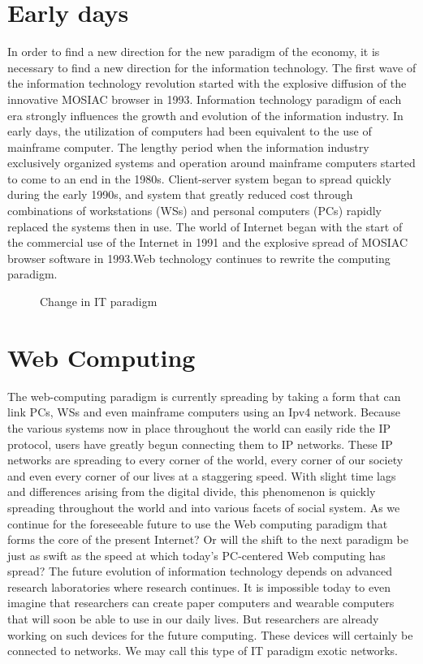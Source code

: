 \documentclass[12pt]{report}
\begin{document}
\section{Early days}
\hspace*{0.5in}In order to find a new direction for the new paradigm of the economy, it is necessary to find a new direction for the information technology. The first wave of the information technology revolution started with the explosive diffusion of the innovative MOSIAC browser in 1993. Information technology paradigm of each era strongly influences the growth and evolution of the information industry. In early days, the utilization of computers had been equivalent to the use of mainframe computer. The lengthy period when the information industry exclusively organized systems and operation around mainframe computers started to come to an end in the 1980s. Client-server system began to spread quickly during the early 1990s, and system that greatly reduced cost through combinations of workstations (WSs) and personal computers (PCs) rapidly replaced the systems then in use. The world of Internet began with the start of the commercial use of the Internet in 1991 and the explosive spread of MOSIAC browser software in 1993.Web technology continues to rewrite the computing paradigm.
\begin{figure}[h]
\begin{centre}
\centerline{}
\caption{Change in IT paradigm}
\end{centre}
\end{figure}

\section{Web Computing}
\hspace*{0.5in}The web-computing paradigm is currently spreading by taking a form that can link PCs, WSs and even mainframe computers using an Ipv4 network. Because the various systems now in place throughout the world can easily ride the IP protocol, users have greatly begun connecting them to IP networks. These IP networks are spreading to every corner of the world, every corner of our society and even every corner of our lives at a staggering speed. With slight time lags and differences arising from the digital divide, this phenomenon is quickly spreading throughout the world and into various facets of social system. As we continue for the foreseeable future to use the Web computing paradigm that forms the core of the present Internet? Or will the shift to the next paradigm be just as swift as the speed at which today's PC-centered Web computing has spread? The future evolution of information technology depends on advanced research laboratories where research continues. It is impossible today to even imagine that researchers can create paper computers and wearable computers that will soon be able to use in our daily lives. But researchers are already working on such devices for the future computing. These devices will certainly be connected to networks. We may call this type of IT paradigm exotic networks.
\end{document}

